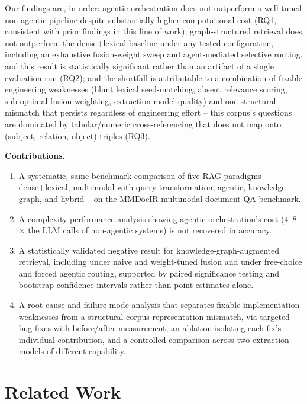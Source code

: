 \documentclass[sigconf,anonymous,review]{acmart}
\begin{document}
Our findings are, in order: agentic orchestration does not outperform a well-tuned non-agentic pipeline despite substantially higher computational cost (RQ1, consistent with prior findings in this line of work); graph-structured retrieval does not outperform the dense+lexical baseline under any tested configuration, including an exhaustive fusion-weight sweep and agent-mediated selective routing, and this result is statistically significant rather than an artifact of a single evaluation run (RQ2); and the shortfall is attributable to a combination of fixable engineering weaknesses (blunt lexical seed-matching, absent relevance scoring, sub-optimal fusion weighting, extraction-model quality) and one structural mismatch that persists regardless of engineering effort -- this corpus's questions are dominated by tabular/numeric cross-referencing that does not map onto (subject, relation, object) triples (RQ3).

\textbf{Contributions.}
\begin{enumerate}
\item A systematic, same-benchmark comparison of five RAG paradigms -- dense+lexical, multimodal with query transformation, agentic, knowledge-graph, and hybrid -- on the MMDocIR multimodal document QA benchmark.
\item A complexity-performance analysis showing agentic orchestration's cost (4--8$\times$ the LLM calls of non-agentic systems) is not recovered in accuracy.
\item A statistically validated negative result for knowledge-graph-augmented retrieval, including under naive and weight-tuned fusion and under free-choice and forced agentic routing, supported by paired significance testing and bootstrap confidence intervals rather than point estimates alone.
\item A root-cause and failure-mode analysis that separates fixable implementation weaknesses from a structural corpus-representation mismatch, via targeted bug fixes with before/after measurement, an ablation isolating each fix's individual contribution, and a controlled comparison across two extraction models of different capability.
\end{enumerate}

\section{Related Work}
\end{document}
